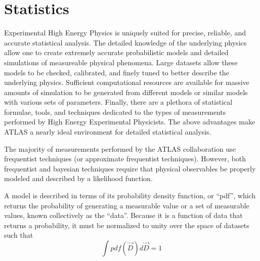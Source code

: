 

\section{Statistics}


Experimental High Energy Physics is uniquely suited for precise, reliable, and accurate statistical analysis.
The detailed knowledge of the underlying physics allow one to create extremely accurate probabilistic models and detailed simulations of measureable physical phenomena.
Large datasets allow these models to be checked, calibrated, and finely tuned to better describe the underlying physics.
Sufficient computational resources are available for massive amounts of simulation to be generated from different models or similar models with various sets of parameters.
Finally, there are a plethora of statistical formulae, tools, and techniques dedicated to the types of measurements performed by High Energy Experimental Physicists.
The above advantages make ATLAS a nearly ideal environment for detailed statistical analysis.


The majority of measurements performed by the ATLAS collaboration use frequentist techniques (or approximate frequentist techniques).
However, both frequentist and bayesian techniques require that physical observables be properly modeled and described by a likelihood function.

A model is described in terms of its probability density function, or ``pdf'', which returns the probability of generating a measurable value or a set of measurable values, known collectively as the ``data''.
Because it is a function of data that returns a probability, it must be normalized to unity over the space of datasets such that
\begin{equation}
\int pdf(\vec{D}) d\vec{D} = 1
\end{equation}

